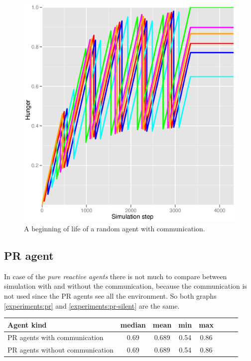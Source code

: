 \begin{figure}[h!]
  \centering                                
  \includegraphics[scale=0.4]{diagrams/experiments/random_start.eps}    
  \caption{A beginning of life of a random agent with communication.}
  \label{experiments:random-start}
\end{figure}        

\clearpage

\subsection{PR agent}

In case of the \emph{pure reactive agents} there is not much to compare between simulation with and without the communication, because the communication is not used since the PR agents see all the environment. So both graphs \ref{experiments:pr} and \ref{experiments:pr-silent} are the same.

\begin{center}   
  \begin{tabular}{l*{6}{c}r}
  Agent kind        & median & mean & min & max \\
  \hline  
  PR agents with communication        & 0.69 & 0.689 & 0.54 & 0.86 \\
  PR agents without communication     & 0.69 & 0.689 & 0.54 & 0.86 \\
  \end{tabular}                  
\end{center}

